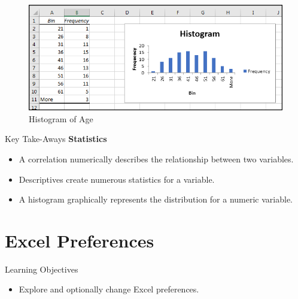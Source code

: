 \begin{figure}[H]
	\centering
	\includegraphics[width=\maxwidth{.95\linewidth}]{gfx/ch09_fig63}
	\caption{Histogram of Age}
	\label{09:fig63}
\end{figure}

\begin{center}
	\begin{tkwbox}{Key Take-Aways}
		\textbf{Statistics}
		\\
		\begin{itemize}
			\setlength{\itemsep}{0pt}
			\setlength{\parskip}{0pt}
			\setlength{\parsep}{0pt}
			
			\item A correlation numerically describes the relationship between two variables.
			\item Descriptives create numerous statistics for a variable.
			\item A histogram graphically represents the distribution for a numeric variable.
			
		\end{itemize}
	\end{tkwbox}
\end{center}


\section{Excel Preferences}

\begin{center}
	\begin{objbox}{Learning Objectives}
		\begin{itemize}
			\setlength{\itemsep}{0pt}
			\setlength{\parskip}{0pt}
			\setlength{\parsep}{0pt}
			
			\item Explore and optionally change Excel preferences.
			
		\end{itemize}
	\end{objbox}
\end{center}

